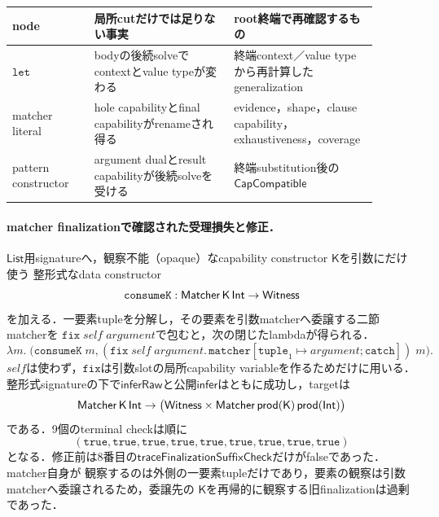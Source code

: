 \begin{center}
\begin{tabular}{p{0.20\linewidth}p{0.34\linewidth}p{0.35\linewidth}}
\toprule
node & 局所cutだけでは足りない事実 & root終端で再確認するもの \\
\midrule
$\mathtt{let}$
  & bodyの後続solveでcontextとvalue typeが変わる
  & 終端context／value typeから再計算したgeneralization \\
matcher literal
  & hole capabilityとfinal capabilityがrenameされ得る
  & evidence，shape，clause capability，exhaustiveness，coverage \\
pattern constructor
  & argument dualとresult capabilityが後続solveを受ける
  & 終端substitution後の$\mathsf{CapCompatible}$ \\
\bottomrule
\end{tabular}
\end{center}

\paragraph{matcher finalizationで確認された受理損失と修正．}
$\mathsf{List}$用signatureへ，観察不能（opaque）なcapability constructor $\mathsf K$を引数にだけ使う
整形式なdata constructor
\[
\mathtt{consumeK}:\mathsf{Matcher}\,\mathsf K\,\mathsf{Int}\to\mathsf{Witness}
\]
を加える．一要素tupleを分解し，その要素を引数matcherへ委譲する二節matcherを
$\mathtt{fix}\;\mathit{self}\;\mathit{argument}$で包むと，次の閉じたlambdaが得られる．
\[
\lambda m.\;\bigl(
  \mathtt{consumeK}\;m,
  (\mathtt{fix}\;\mathit{self}\;\mathit{argument}.\,
    \mathtt{matcher}[\mathtt{tuple}_1\mapsto\mathit{argument};\mathtt{catch}])\;m
\bigr).
\]
$\mathit{self}$は使わず，$\mathtt{fix}$は引数slotの局所capability variableを作るためだけに用いる．
整形式signatureの下で$\mathsf{inferRaw}$と公開$\mathsf{infer}$はともに成功し，targetは
\[
\mathsf{Matcher}\,\mathsf K\,\mathsf{Int}\to
\bigl(\mathsf{Witness}\times
  \mathsf{Matcher}\,\mathsf{prod}(\mathsf K)\,\mathsf{prod}(\mathsf{Int})\bigr)
\]
である．9個のterminal checkは順に
\[
(\mathtt{true},\mathtt{true},\mathtt{true},\mathtt{true},\mathtt{true},
 \mathtt{true},\mathtt{true},\mathtt{true},\mathtt{true})
\]
となる．修正前は8番目の$\mathsf{traceFinalizationSuffixCheck}$だけがfalseであった．matcher自身が
観察するのは外側の一要素tupleだけであり，要素の観察は引数matcherへ委譲されるため，委譲先の
$\mathsf K$を再帰的に観察する旧finalizationは過剰であった．

